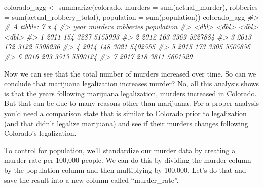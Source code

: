 \documentclass[
]{krantz}
\makeatletter
\newenvironment{Shaded}{\begin{snugshade}}{\end{snugshade}}
\newcommand{\AttributeTok}[1]{\textcolor[rgb]{0.61,0.61,0.61}{#1}}
\newcommand{\CommentTok}[1]{\textcolor[rgb]{0.37,0.37,0.37}{\textit{#1}}}
\newcommand{\DecValTok}[1]{\textcolor[rgb]{0.06,0.06,0.06}{#1}}
\newcommand{\FunctionTok}[1]{\textcolor[rgb]{0,0,0}{#1}}
\newcommand{\NormalTok}[1]{#1}
\newcommand{\OtherTok}[1]{\textcolor[rgb]{0.37,0.37,0.37}{#1}}
\newcommand{\SpecialCharTok}[1]{\textcolor[rgb]{0,0,0}{#1}}
\newenvironment{kframe}{%
\medskip{}
\setlength{\fboxsep}{.8em}
 \def\at@end@of@kframe{}%
 \ifinner\ifhmode%
  \def\at@end@of@kframe{\end{minipage}}%
  \begin{minipage}{\columnwidth}%
 \fi\fi%
 \def\FrameCommand##1{\hskip\@totalleftmargin \hskip-\fboxsep
 \colorbox{shadecolor}{##1}\hskip-\fboxsep
     \hskip-\linewidth \hskip-\@totalleftmargin \hskip\columnwidth}%
 \MakeFramed {\advance\hsize-\width
   \@totalleftmargin\z@ \linewidth\hsize
   \@setminipage}}%
 {\par\unskip\endMakeFramed%
 \at@end@of@kframe}
\renewenvironment{Shaded}{\begin{kframe}}{\end{kframe}}
\makeatother
\begin{document}
\begin{Shaded}
\begin{Highlighting}[]
\NormalTok{colorado\_agg }\OtherTok{\textless{}{-}} \FunctionTok{summarize}\NormalTok{(colorado,}
                          \AttributeTok{murders    =} \FunctionTok{sum}\NormalTok{(actual\_murder),}
                          \AttributeTok{robberies  =} \FunctionTok{sum}\NormalTok{(actual\_robbery\_total),}
                          \AttributeTok{population =} \FunctionTok{sum}\NormalTok{(population))}
\NormalTok{colorado\_agg}
\CommentTok{\#\textgreater{} \# A tibble: 7 x 4}
\CommentTok{\#\textgreater{}    year murders robberies population}
\CommentTok{\#\textgreater{}   \textless{}dbl\textgreater{}   \textless{}dbl\textgreater{}     \textless{}dbl\textgreater{}      \textless{}dbl\textgreater{}}
\CommentTok{\#\textgreater{} 1  2011     154      3287    5155993}
\CommentTok{\#\textgreater{} 2  2012     163      3369    5227884}
\CommentTok{\#\textgreater{} 3  2013     172      3122    5308236}
\CommentTok{\#\textgreater{} 4  2014     148      3021    5402555}
\CommentTok{\#\textgreater{} 5  2015     173      3305    5505856}
\CommentTok{\#\textgreater{} 6  2016     203      3513    5590124}
\CommentTok{\#\textgreater{} 7  2017     218      3811    5661529}
\end{Highlighting}
\end{Shaded}

Now we can see that the total number of murders increased over time. So can we conclude that marijuana legalization increases murder? No, all this analysis shows is that the years following marijuana legalization, murders increased in Colorado. But that can be due to many reasons other than marijuana. For a proper analysis you'd need a comparison state that is similar to Colorado prior to legalization (and that didn't legalize marijuana) and see if their murders changes following Colorado's legalization.

To control for population, we'll standardize our murder data by creating a murder rate per 100,000 people. We can do this by dividing the murder column by the population column and then multiplying by 100,000. Let's do that and save the result into a new column called ``murder\_rate''.

\begin{Shaded}
\end{Shaded}
\end{document}
